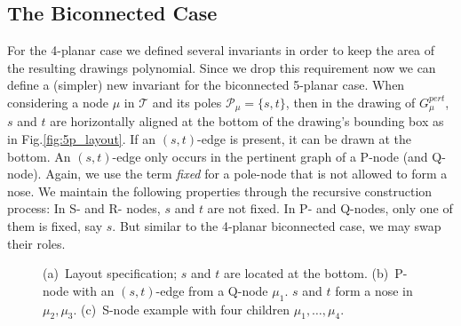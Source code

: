 \documentclass[a4paper,twoside,11pt]{article}
\newcommand{\pert}[1]{G^\textit{pert}_{#1}}
\begin{document}
\subsection{The Biconnected Case}
\label{sec:bicon}


For the 4-planar case we defined several invariants in order to keep
the area of the resulting drawings polynomial. Since we drop this
requirement now we can define a (simpler) new invariant for the
biconnected 5-planar case. When considering a node $\mu$ in
$\mathcal{T}$ and its poles $\mathcal{P}_\mu = \{ s, t \}$, then in
the drawing of $\pert{\mu}$, $s$ and $t$ are horizontally aligned at
the bottom of the drawing's bounding box as in
Fig.\ref{fig:5p_layout}. If an $(s,t)$-edge is present, it can be
drawn at the bottom. An $(s,t)$-edge only occurs in the pertinent
graph of a P-node (and Q-node). Again, we use the term \emph{fixed}
for a pole-node that is not allowed to form a nose. We maintain the
following properties through the recursive construction process: In
S- and R- nodes, $s$ and $t$ are not fixed. In P- and Q-nodes, only
one of them is fixed, say $s$. But similar to the 4-planar
biconnected case, we may swap their roles.

\begin{figure}[t]
    \centering
    \begin{minipage}[b]{.24\textwidth}
        \centering
    \end{minipage}
    \begin{minipage}[b]{.24\textwidth}
        \centering
    \end{minipage}
    \begin{minipage}[b]{.45\textwidth}
        \centering
    \end{minipage}
    \caption{
    (a)~Layout specification; $s$ and $t$ are located at the bottom.
    (b)~P-node with an $(s,t)$-edge from a Q-node $\mu_1$. $s$ and $t$ form a nose in $\mu_2, \mu_3$.
    (c)~S-node example with four children $\mu_1, \ldots,  \mu_4$.}
    \label{fig:5p_bicon}
\end{figure}
\end{document}
